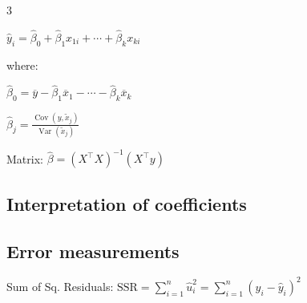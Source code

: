 \documentclass[10pt, a4paper, landscape]{article}
\DeclareMathOperator{\Var}{Var}
\DeclareMathOperator{\Cov}{Cov}
\newcommand{\SSR}{\text{SSR}}
\begin{document}
\begin{multicols}{3}
\begin{minipage}{0.58\columnwidth}
	\begin{center}
		\( \hat{y}_{i} = \hat{\beta}_{0} + \hat{\beta}_{1} x_{1i} + \cdots + \hat{\beta}_{k} x_{ki} \)
	\end{center}
	
	where:
	
	\begin{center}
		\( \hat{\beta}_{0} = \overline{y} - \hat{\beta}_{1} \overline{x}_{1} - \cdots - \hat{\beta}_{k} \overline{x}_{k} \)
	
		\( \hat{\beta}_{j} = \frac{\Cov(y, \tilde{x}_{j})}{\Var(\tilde{x}_{j})} \)
	\end{center}
	
	Matrix: \( \hat{\beta} = (X^{\top} X)^{-1}(X^{\top} y) \)
\end{minipage}

\subsection*{Interpretation of coefficients}

\begin{center}
\end{center}

\subsection*{Error measurements}

Sum of Sq. Residuals: \hfill \( \SSR = \sum_{i = 1}^{n} \hat{u}_{i}^{2} = \sum_{i = 1}^{n} (y_{i} - \hat{y}_{i})^{2} \)


\end{multicols}
\end{document}
